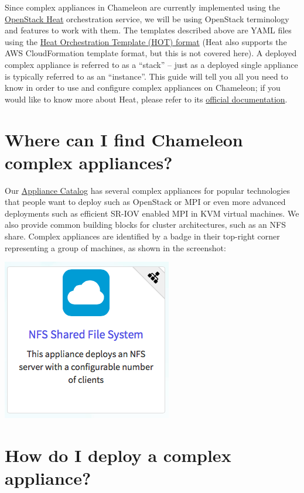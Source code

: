 Since complex appliances in Chameleon are currently implemented using
the \href{https://wiki.openstack.org/wiki/Heat}{OpenStack Heat}
orchestration service, we will be using OpenStack terminology and
features to work with them. The templates described above are YAML files
using the
\href{http://docs.openstack.org/developer/heat/template_guide/hot_spec.html}{Heat
Orchestration Template (HOT) format} (Heat also supports the AWS
CloudFormation template format, but this is not covered here). A
deployed complex appliance is referred to as a ``stack'' -- just as a
deployed single appliance is typically referred to as an ``instance''.
This guide will tell you all you need to know in order to use and
configure complex appliances on Chameleon; if you would like to know
more about Heat, please refer to its
\href{http://docs.openstack.org/developer/heat/}{official
documentation}.

\section{Where can I find Chameleon complex
appliances?}\label{where-can-i-find-chameleon-complex-appliances}

Our \href{https://www.chameleoncloud.org/appliances/}{Appliance Catalog}
has several complex appliances for popular technologies that people want
to deploy such as OpenStack or MPI or even more advanced deployments
such as efficient SR-IOV enabled MPI in KVM virtual machines. We also
provide common building blocks for cluster architectures, such as an NFS
share. Complex appliances are identified by a badge in their top-right
corner representing a group of machines, as shown in the screenshot:

\includegraphics[width=0.5\columnwidth]{images/chameleon/NFS.png}

\section{How do I deploy a complex
appliance?}\label{how-do-i-deploy-a-complex-appliance}

